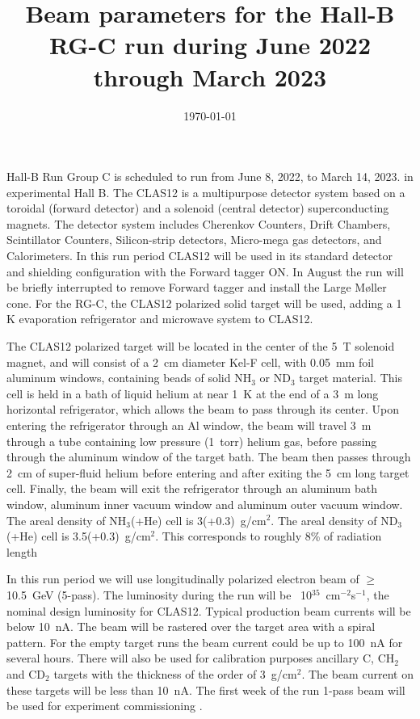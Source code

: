 \documentclass[12pt]{article}
\begin{document}
\title{Beam parameters for the Hall-B RG-C run during June 2022 through March 2023}
\author{}
\date{\today}
\maketitle

Hall-B Run Group C is scheduled to run from June 8, 2022, to March 14, 2023. in experimental Hall B. The CLAS12 is a multipurpose detector system based on a toroidal (forward detector) and a solenoid (central  detector) superconducting magnets. The detector system includes Cherenkov Counters, Drift Chambers, Scintillator Counters, Silicon-strip detectors, Micro-mega gas detectors, and Calorimeters. In this run period CLAS12 will be used in its standard detector and shielding configuration with the Forward tagger ON. In August the run will be briefly interrupted  to remove Forward tagger and install the Large M\o{}ller cone. For the RG-C, the CLAS12 polarized solid target will be used, adding a 1 K evaporation refrigerator and microwave system to CLAS12. 

The CLAS12 polarized target will be located in the center of the 5~T solenoid magnet, and will consist of a 2~cm diameter Kel-F cell, with 0.05~mm foil aluminum windows, containing beads of solid NH$_3$ or ND$_3$ target material. This cell is held in a bath of liquid helium at near 1~K at the end of a 3~m long horizontal refrigerator, which allows the beam to pass through its center. Upon entering the refrigerator through an Al window, the beam will travel 3~m through a tube containing low pressure (1~torr) helium gas, before passing through the aluminum window of the target bath. The beam then passes through 2~cm of super-fluid helium before entering and after exiting the 5~cm long target cell. Finally, the beam will exit the refrigerator through an aluminum bath window, aluminum inner vacuum window and aluminum outer vacuum window. The areal density of NH$_3$(+He) cell is 3(+0.3)~g/cm$^2$. The areal density of ND$_3$(+He) cell is 3.5(+0.3)~g/cm$^2$. This corresponds to roughly 8\% of radiation length

In this run period we will use longitudinally polarized electron beam of $\ge$10.5~GeV (5-pass). The luminosity during the run will be ~10$^{35}$~cm$^{-2}$s$^{-1}$, the nominal design luminosity for CLAS12. Typical production beam currents will be below 10~nA. The beam will be rastered over the target area with a spiral pattern. For the empty target runs the beam current could be up to 100~nA for several hours. There will also be used for calibration purposes ancillary C, CH$_2$ and CD$_2$ targets with the thickness of the order of 3~g/cm$^2$. The beam current on these targets will be less than 10~nA. The first week of the run 1-pass beam will be used for experiment commissioning .
\end{document}
